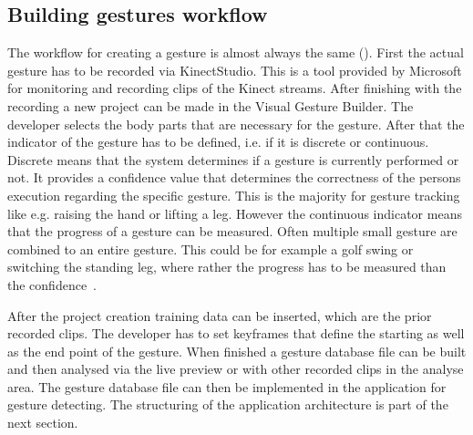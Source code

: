 \subsection{Building gestures workflow}
The workflow for creating a gesture is almost always the same (). 
First the actual gesture has to be recorded via KinectStudio. This is a tool provided by Microsoft for monitoring and recording clips of the Kinect streams. After finishing with the recording a new project can be made in the Visual Gesture Builder. The developer selects the body parts that are necessary for the gesture. After that the indicator of the gesture has to be defined, i.e. if it is discrete or continuous. Discrete means that the system determines if a gesture is currently performed or not. It provides a confidence value that determines the correctness of the persons execution regarding the specific gesture. This is the majority for gesture tracking like e.g. raising the hand or lifting a leg. However the continuous indicator means that the progress of a gesture can be measured. Often multiple small gesture are combined to an entire gesture. This could be for example a golf swing or switching the standing leg, where rather the progress has to be measured than the confidence~\cite{MicrosoftVGB}.

After the project creation training data can be inserted, which are the prior recorded clips. The developer has to set keyframes that define the starting as well as the end point of the gesture. When finished a gesture database file can be built and then analysed via the live preview  or with other recorded clips in the analyse area. The gesture database file can then be implemented in the application for gesture detecting. The structuring of the application architecture is part of the next section.
